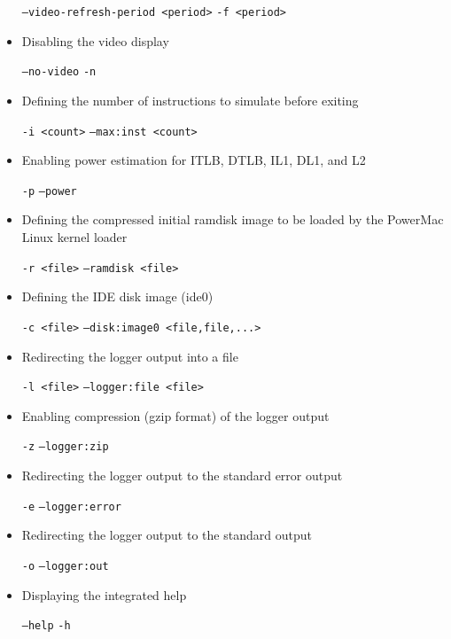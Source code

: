 \begin{itemize}
\texttt{--video-refresh-period <period>}
\texttt{-f <period>}

\item Disabling the video display

\texttt{--no-video}
\texttt{-n}

\item Defining the number of instructions to simulate before exiting

\texttt{-i <count>}
\texttt{--max:inst <count>}

\item Enabling power estimation for ITLB, DTLB, IL1, DL1, and L2

\texttt{-p}
\texttt{--power}

\item Defining the compressed initial ramdisk image to be loaded by the PowerMac Linux kernel loader

\texttt{-r <file>}
\texttt{--ramdisk <file>}

\item Defining the IDE disk image (ide0)

\texttt{-c <file>}
\texttt{--disk:image0 <file,file,...>}

\item Redirecting the logger output into a file

\texttt{-l <file>}
\texttt{--logger:file <file>}

\item Enabling compression (gzip format) of the logger output

\texttt{-z}
\texttt{--logger:zip}

\item Redirecting the logger output to the standard error output

\texttt{-e}
\texttt{--logger:error}

\item Redirecting the logger output to the standard output

\texttt{-o}
\texttt{--logger:out}

\item Displaying the integrated help

\texttt{--help}
\texttt{-h}

\end{itemize}